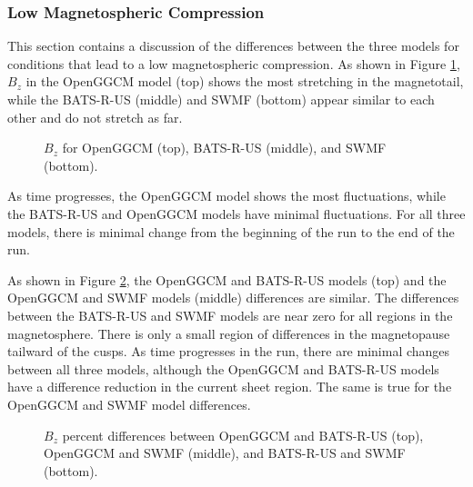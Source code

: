 \subsubsection{Low Magnetospheric Compression}
This section contains a discussion of the differences between the three models for
conditions that lead to a low magnetospheric compression.
As shown in Figure \ref{fig:BLowCompressionBeginning}, $B_z$ in
the OpenGGCM model (top) shows the most stretching in the magnetotail, while the
BATS-R-US (middle) and SWMF (bottom) appear similar to each other and do not stretch as far.
\begin{figure}
	\centering
	\caption{$B_z$ for OpenGGCM (top), BATS-R-US (middle), and SWMF (bottom).}
	\figSpace
	\label{fig:BLowCompressionBeginning}
\end{figure}
As time progresses, the OpenGGCM model shows the most fluctuations,
while the BATS-R-US and OpenGGCM models have minimal fluctuations. For all three
models, there is minimal change from the beginning of the run to the end of the
run.

As shown in Figure \ref{fig:BDiffLowBeginning}, the OpenGGCM and BATS-R-US
models (top) and the OpenGGCM and SWMF models (middle) differences are similar. The differences between the BATS-R-US and SWMF models are near
zero for all regions in the magnetosphere. There is only a small region of differences in the magnetopause
tailward of the cusps. As time progresses in the run, there are minimal changes
between all three models, although the OpenGGCM and BATS-R-US models have a difference
reduction in the current sheet region. The same is true for the OpenGGCM and
SWMF model differences.
\begin{figure}
	\centering
    \caption{$B_z$ percent differences between OpenGGCM and BATS-R-US (top),
    OpenGGCM and SWMF (middle), and BATS-R-US and SWMF (bottom).
    }
    \label{fig:BDiffLowBeginning}
	\figSpace
\end{figure}

